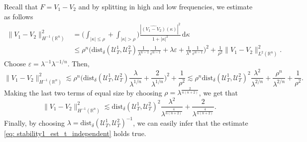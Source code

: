 \documentclass[10pt,a4paper]{amsart}
\theoremstyle{remark}
\theoremstyle{definition}
\newcommand{\R}{\mathbb{R}}
\newcommand{\dd}{\mathrm{d}}
\newcommand{\dist}{\mathrm{dist}}
\def\ve{\varepsilon}
\def\lec{\lesssim}
\def\wh{\widehat}
\def\cal{\mathcal}
\begin{document}
Recall that $F=V_1-V_2$ and by splitting in high and low frequencies, we estimate as follows 
%
\begin{align*}
%
\|V_1-V_2\|_{H^{-1}(\R^n)}^2 &= \Big( \int_{|\kappa|\leq \rho} + \int_{|\kappa|>\rho} \Big) \frac{|\wh{(V_1-V_2)}(\kappa)|^2}{1+|\kappa|^2}\, \dd\kappa \\
%
&\leq \rho^n \Big( \dist_\delta(\cal{U}^1_T, \cal{U}^2_T)  \frac{1}{\lambda^{n-1}} \frac{1}{\ve^{n-1}} + \lambda \ve + \frac{1}{\lambda^n}\frac{1}{\ve^{n-1}}\Big)^2 + \frac{1}{\rho^2} \| V_1-V_2 \|_{L^2(\R^n)}^2.
%
\end{align*}
%
Choose $\ve=\lambda^{-1} \lambda^{-1/n}$. Then, 
%
\[
\|V_1-V_2\|_{H^{-1}(\R^n)}^2 \lec \rho^n  \Big( \dist_\delta(\cal{U}^1_T, \cal{U}^2_T)  \frac{\lambda}{\lambda^{1/n}} + \frac{2}{\lambda^{1/n}}\Big)^2 + \frac{1}{\rho^2} 
\lec \rho^n \dist_\delta(\cal{U}^1_T, \cal{U}^2_T)^2  \frac{\lambda^2}{\lambda^{2/n}} + \frac{\rho^n}{\lambda^{2/n}} + \frac{1}{\rho^2}.
\]
%
Making the last two terms of equal size by choosing $\rho=\lambda^{\frac{2}{n(n+2)}}$, we get that 
%
\[
\|V_1-V_2\|_{H^{-1}(\R^n)}^2 \lec \dist_\delta(\cal{U}^1_T, \cal{U}^2_T)^2 \frac{\lambda^2}{\lambda^{\frac{4}{n(n+2)}}} 
+ \frac{2}{\lambda^{\frac{4}{n(n+2)}}}. 
\]
%
Finally, by choosing $\lambda= \dist_\delta(\cal{U}^1_T, \cal{U}^2_T)^{-1}$, we can easily infer that the estimate
\eqref{eq: stability1_est_t_independent} holds true. 



\vspace{0.4cm}
\end{document}
